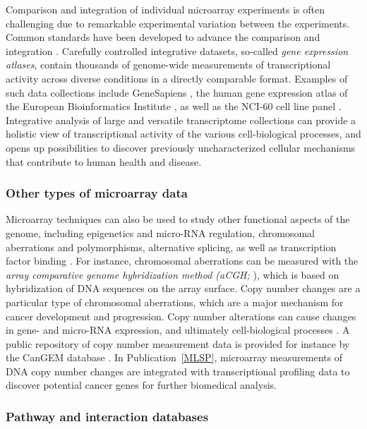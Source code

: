 Comparison and integration of individual microarray experiments is
often challenging due to remarkable experimental variation between the
experiments. Common standards have been developed to advance the
comparison and integration \citep{Brazma01, Brazma06}. Carefully
controlled integrative datasets, so-called {\it gene expression
  atlases}, contain thousands of genome-wide measurements of
transcriptional activity across diverse conditions in a directly
comparable format. Examples of such data collections include
GeneSapiens \citep{Kilpinen08}, the human gene expression atlas of the
European Bioinformatics Institute \citep{Lukk10}, as well as the
NCI-60 cell line panel \citep{Scherf2000}. Integrative analysis of
large and versatile transcriptome collections can provide a holistic
view of transcriptional activity of the various cell-biological
processes, and opens up possibilities to discover previously
uncharacterized cellular mechanisms that contribute to human health
and disease.


\subsubsection{Other types of microarray data}

Microarray techniques can also be used to study other functional
aspects of the genome, including epigenetics and micro-RNA regulation,
chromosomal aberrations and polymorphisms, alternative splicing, as
well as transcription factor binding \citep{Butte02a, Hoheisel06}.
For instance, chromosomal aberrations can be measured with the {\it
  array comparative genome hybridization method (aCGH;}
\citealt{Pinkel2005}), which is based on hybridization of DNA sequences
on the array surface. Copy number changes are a particular type of
chromosomal aberrations, which are a major mechanism for cancer
development and progression. Copy number alterations can cause changes
in gene- and micro-RNA expression, and ultimately cell-biological
processes \citep{Beroukhim10}.  A public repository of copy number
measurement data is provided for instance by the CanGEM database
\citep{Scheinin08}. In Publication~\ref{MLSP}, microarray measurements
of DNA copy number changes are integrated with transcriptional
profiling data to discover potential cancer genes for further
biomedical analysis.

\subsubsection{Pathway and interaction databases}

